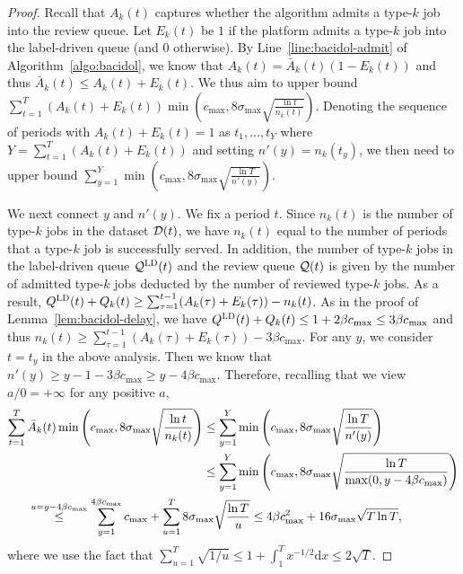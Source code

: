 \begin{proof}
Recall that $A_k(t)$ captures whether the algorithm admits a type-$k$ job into the review queue. Let $E_k(t)$ be $1$ if the platform admits a type-$k$ job into the label-driven queue (and $0$ otherwise). By Line~\ref{line:bacidol-admit} of Algorithm~\ref{algo:bacidol}, we know that $A_k(t) = \bar{A}_k(t)(1-E_k(t))$ and thus $\bar{A}_k(t) \leq A_k(t)+E_k(t)$. We thus aim to upper bound $\sum_{t=1}^T(A_k(t)+E_k(t))\min\left(c_{\max},8\sigma_{\max}\sqrt{\frac{\ln t}{n_k(t)}}\right)$. Denoting the sequence of periods with $A_k(t)+E_k(t) = 1$ as $t_1,\ldots,t_Y$ where $Y = \sum_{t=1}^T \left(A_k(t) + E_k(t)\right)$ and setting $n'(y) = n_k(t_y)$, we then need to upper bound $\sum_{y=1}^Y \min\left(c_{\max}, 8\sigma_{\max}\sqrt{\frac{\ln T}{n'(y)}}\right).$

We next connect $y$ and $n'(y)$. We fix a period $t$. Since $n_k(t)$ is the number of type-$k$ jobs in the dataset $\mathcal{D}(t)$, we have $n_k(t)$ equal to the number of periods that a type-$k$ job is successfully served. In addition, the number of type-$k$ jobs in the label-driven queue $\mathcal{Q}^{\mathcal{\textsc{LD}}}(t)$  and the review queue $\mathcal{Q}(t)$ is given by the number of admitted type-$k$ jobs deducted by the number of reviewed type-$k$ jobs. As a result, $Q^{\mathcal{\textsc{LD}}}(t) + Q_k(t) \geq \sum_{\tau=1}^{t-1} (A_k(\tau) + E_k(\tau)) - n_k(t)$. As in the proof of Lemma~\ref{lem:bacidol-delay}, we have $Q^{\mathcal{\textsc{LD}}}(t) + Q_k(t) \leq 1 + 2\beta c_{\max} \leq 3\beta c_{\max}$ and thus $n_k(t) \geq \sum_{\tau=1}^{t-1} (A_k(\tau) + E_k(\tau)) - 3\beta c_{\max}$. For any $y$, we consider $t = t_y$ in the above analysis. Then we know that $n'(y) \geq y - 1 - 3\beta c_{\max} \geq y - 4\beta c_{\max}$. Therefore, recalling that we view $a / 0 = +\infty$ for any positive $a$, 
\begin{align*}
\sum_{t=1}^T\bar{A}_k(t)\min\left(c_{\max},8\sigma_{\max}\sqrt{\frac{\ln t}{n_k(t)}}\right) &\leq \sum_{y=1}^Y \min\left(c_{\max}, 8\sigma_{\max}\sqrt{\frac{\ln T}{n'(y)}}\right) \\
&\leq \sum_{y=1}^Y \min\left(c_{\max}, 8\sigma_{\max}\sqrt{\frac{\ln T}{\max(0, y - 4\beta c_{\max})}}\right) \\
&\hspace{-2in}\overset{u = y - 4\beta c_{\max}}{\leq} \sum_{y=1}^{4\beta c_{\max}} c_{\max} + \sum_{u=1}^T  8\sigma_{\max}\sqrt{\frac{\ln T}{u}} \leq 4\beta c^2_{\max}+16\sigma_{\max}\sqrt{T\ln T},
\end{align*}
where we use the fact that $\sum_{u=1}^T \sqrt{1/u} \leq 1 + \int_1^T x^{-1/2}\mathrm{d}x \leq 2\sqrt{T}$. 
\end{proof}
